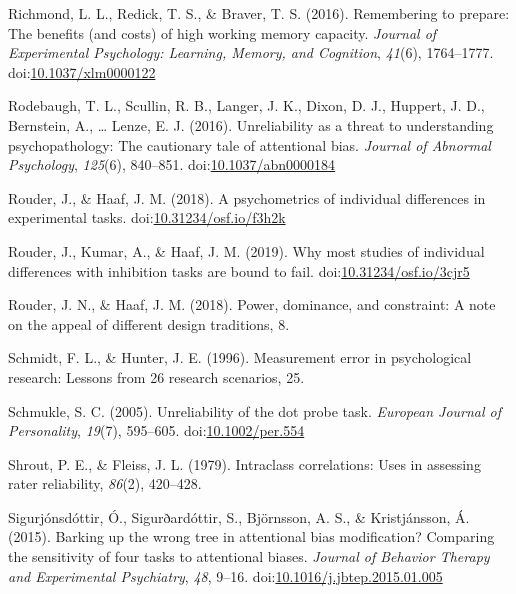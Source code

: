 \documentclass[english,,man,floatsintext]{apa6}
\begin{document}
\leavevmode\hypertarget{ref-richmond_remembering_2016}{}%
Richmond, L. L., Redick, T. S., \& Braver, T. S. (2016). Remembering to prepare: The benefits (and costs) of high working memory capacity. \emph{Journal of Experimental Psychology: Learning, Memory, and Cognition}, \emph{41}(6), 1764--1777. doi:\href{https://doi.org/10.1037/xlm0000122}{10.1037/xlm0000122}

\leavevmode\hypertarget{ref-rodebaugh_unreliability_2016}{}%
Rodebaugh, T. L., Scullin, R. B., Langer, J. K., Dixon, D. J., Huppert, J. D., Bernstein, A., \ldots{} Lenze, E. J. (2016). Unreliability as a threat to understanding psychopathology: The cautionary tale of attentional bias. \emph{Journal of Abnormal Psychology}, \emph{125}(6), 840--851. doi:\href{https://doi.org/10.1037/abn0000184}{10.1037/abn0000184}

\leavevmode\hypertarget{ref-rouder_psychometrics_2018}{}%
Rouder, J., \& Haaf, J. M. (2018). A psychometrics of individual differences in experimental tasks. doi:\href{https://doi.org/10.31234/osf.io/f3h2k}{10.31234/osf.io/f3h2k}

\leavevmode\hypertarget{ref-rouder_why_2019}{}%
Rouder, J., Kumar, A., \& Haaf, J. M. (2019). Why most studies of individual differences with inhibition tasks are bound to fail. doi:\href{https://doi.org/10.31234/osf.io/3cjr5}{10.31234/osf.io/3cjr5}

\leavevmode\hypertarget{ref-rouder_power_2018}{}%
Rouder, J. N., \& Haaf, J. M. (2018). Power, dominance, and constraint: A note on the appeal of different design traditions, 8.

\leavevmode\hypertarget{ref-schmidt_measurement_1996}{}%
Schmidt, F. L., \& Hunter, J. E. (1996). Measurement error in psychological research: Lessons from 26 research scenarios, 25.

\leavevmode\hypertarget{ref-schmukle_unreliability_2005}{}%
Schmukle, S. C. (2005). Unreliability of the dot probe task. \emph{European Journal of Personality}, \emph{19}(7), 595--605. doi:\href{https://doi.org/10.1002/per.554}{10.1002/per.554}

\leavevmode\hypertarget{ref-shrout_intraclass_1979}{}%
Shrout, P. E., \& Fleiss, J. L. (1979). Intraclass correlations: Uses in assessing rater reliability, \emph{86}(2), 420--428.

\leavevmode\hypertarget{ref-sigurjonsdottir_barking_2015}{}%
Sigurjónsdóttir, Ó., Sigurðardóttir, S., Björnsson, A. S., \& Kristjánsson, Á. (2015). Barking up the wrong tree in attentional bias modification? Comparing the sensitivity of four tasks to attentional biases. \emph{Journal of Behavior Therapy and Experimental Psychiatry}, \emph{48}, 9--16. doi:\href{https://doi.org/10.1016/j.jbtep.2015.01.005}{10.1016/j.jbtep.2015.01.005}
\end{document}
